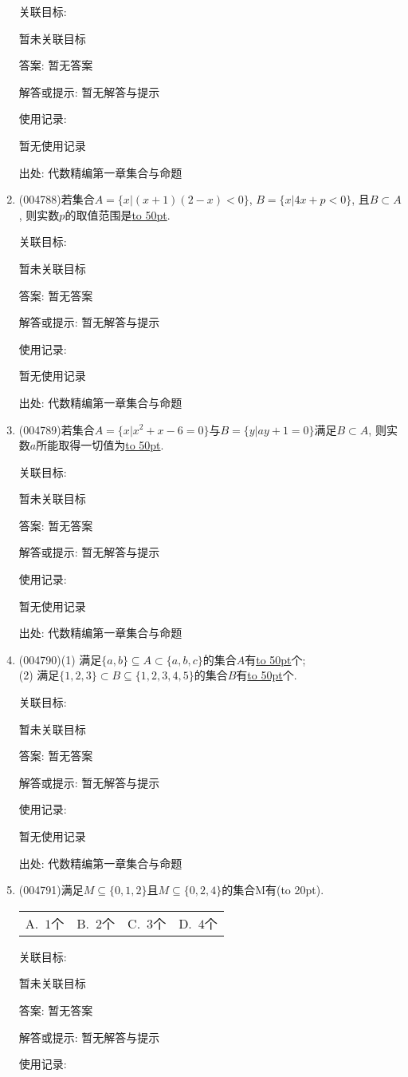 \documentclass[10pt,a4paper]{article}
\newcommand{\blank}[1]{\underline{\hbox to #1pt{}}}
\newcommand{\bracket}[1]{(\hbox to #1pt{})}
\newcommand{\fourch}[4]{\par\begin{tabular}{p{.23\textwidth}p{.23\textwidth}p{.23\textwidth}p{.23\textwidth}}
A.~#1 &B.~#2& C.~#3& D.~#4
\end{tabular}}
\begin{document}
\begin{enumerate}[1.]
关联目标:

暂未关联目标

答案: 暂无答案

解答或提示: 暂无解答与提示

使用记录:

暂无使用记录


出处: 代数精编第一章集合与命题
\item { (004788)}若集合$A=\{x|(x+1)(2-x)<0\}$, $B=\{x|4x+p<0\}$, 且$B\subset A$, 则实数$p$的取值范围是\blank{50}.


关联目标:

暂未关联目标

答案: 暂无答案

解答或提示: 暂无解答与提示

使用记录:

暂无使用记录


出处: 代数精编第一章集合与命题
\item { (004789)}若集合$A=\{x|x^2+x-6=0\}$与$B=\{y|ay+1=0\}$满足$B\subset A$, 则实数$a$所能取得一切值为\blank{50}.


关联目标:

暂未关联目标

答案: 暂无答案

解答或提示: 暂无解答与提示

使用记录:

暂无使用记录


出处: 代数精编第一章集合与命题
\item { (004790)}(1) 满足$\{a,b\}\subseteq A\subset \{a,b,c\}$的集合$A$有\blank{50}个;\\
(2) 满足$\{1,2,3\}\subset B\subseteq \{ 1,2,3,4,5\}$的集合$B$有\blank{50}个.


关联目标:

暂未关联目标

答案: 暂无答案

解答或提示: 暂无解答与提示

使用记录:

暂无使用记录


出处: 代数精编第一章集合与命题
\item { (004791)}满足$M\subseteq \{0,1,2\}$且$M\subseteq \{0,2,4\}$的集合M有\bracket{20}.
\fourch{$1$个}{$2$个}{$3$个}{$4$个}


关联目标:

暂未关联目标

答案: 暂无答案

解答或提示: 暂无解答与提示

使用记录:


\end{enumerate}
\end{document}
